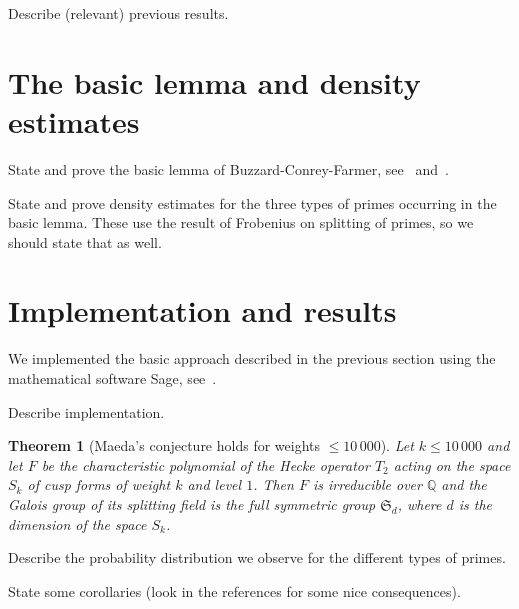 \documentclass[11pt]{article}
\theoremstyle{plain}
\newtheorem{theorem}{Theorem}[section]
\theoremstyle{definition}
\theoremstyle{remark}
\numberwithin{equation}{section}
\numberwithin{table}{section}
\newcommand{\QQ}{\mathbb{Q}}
\renewcommand{\SS}{\mathfrak{S}}
\newcommand{\bound}{10\,000}
\begin{document}
Describe (relevant) previous results.

\section{The basic lemma and density estimates}

State and prove the basic lemma of Buzzard-Conrey-Farmer,
see~\cite{Buzzard} and~\cite[Lemma~4]{ConreyFarmer}.

State and prove density estimates for the three types of primes
occurring in the basic lemma.  These use the result of Frobenius on
splitting of primes, so we should state that as well.

\section{Implementation and results}
We implemented the basic approach described in the previous section
using the mathematical software Sage, see~\cite{Sage}.

Describe implementation.

\begin{theorem}[Maeda's conjecture holds for weights $\leq \bound$]
  Let $k\leq \bound$ and let $F$ be the characteristic polynomial of the
  Hecke operator $T_2$ acting on the space $S_k$ of cusp forms of weight
  $k$ and level $1$.  Then $F$ is irreducible over $\QQ$ and the Galois
  group of its splitting field is the full symmetric group $\SS_d$, 
  where $d$ is the dimension of the space $S_k$.
\end{theorem}


Describe the probability distribution we observe for the different types
of primes.

State some corollaries (look in the references for some nice
consequences).


\printbibliography
\end{document}
